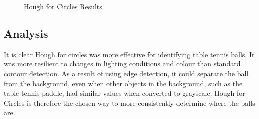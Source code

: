 \begin{figure}[H]
    \centering
    \caption{Hough for Circles Results}
    \label{fig:hough-circles}
\end{figure}

\subsection{Analysis}
It is clear Hough for circles was more effective for identifying table tennis balls. It was more resilient to changes in lighting conditions and colour than standard contour detection. As a result of using edge detection, it could separate the ball from the background, even when other objects in the background, such as the table tennis paddle, had similar values when converted to grayscale. Hough for Circles is therefore the chosen way to more consistently determine where the balls are.